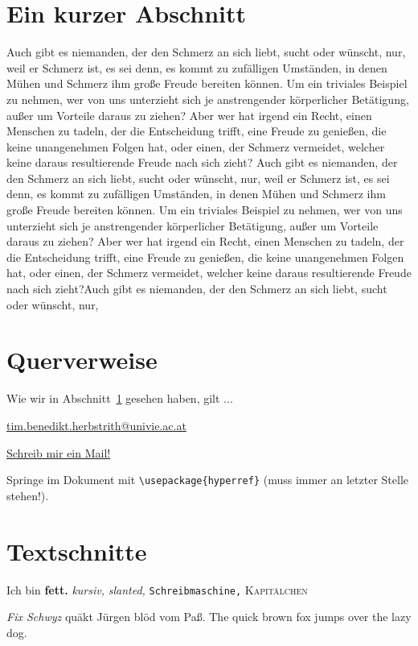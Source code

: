 \documentclass[a4paper]{article}
\begin{document}
\section{Ein kurzer Abschnitt} \label{sec:Ein kurzer Abschnitt}
Auch gibt es niemanden, der den Schmerz an sich liebt, sucht oder wünscht, nur, weil er Schmerz ist, es sei denn, es kommt zu zufälligen Umständen, in denen Mühen und Schmerz ihm große Freude bereiten können. Um ein triviales Beispiel zu nehmen, wer von uns unterzieht sich je anstrengender körperlicher Betätigung, außer um Vorteile daraus zu ziehen? Aber wer hat irgend ein Recht, einen Menschen zu tadeln, der die Entscheidung trifft, eine Freude zu genießen, die keine unangenehmen Folgen hat, oder einen, der Schmerz vermeidet, welcher keine daraus resultierende Freude nach sich zieht? Auch gibt es niemanden, der den Schmerz an sich liebt, sucht oder wünscht, nur, weil er Schmerz ist, es sei denn, es kommt zu zufälligen Umständen, in denen Mühen und Schmerz ihm große Freude bereiten können. Um ein triviales Beispiel zu nehmen, wer von uns unterzieht sich je anstrengender körperlicher Betätigung, außer um Vorteile daraus zu ziehen? Aber wer hat irgend ein Recht, einen Menschen zu tadeln, der die Entscheidung trifft, eine Freude zu genießen, die keine unangenehmen Folgen hat, oder einen, der Schmerz vermeidet, welcher keine daraus resultierende Freude nach sich zieht?Auch gibt es niemanden, der den Schmerz an sich liebt, sucht oder wünscht, nur, 


\section{Querverweise}
Wie wir in Abschnitt~\ref{sec:Ein kurzer Abschnitt} gesehen haben, gilt ...

\url{tim.benedikt.herbstrith@univie.ac.at}

\href{mailto:tim.benedikt.herbstrith@univie.ac.at}{Schreib mir ein Mail!}

Springe im Dokument mit \verb+\usepackage{hyperref}+ (muss immer an letzter Stelle stehen!).

\section{Textschnitte}
Ich bin \textbf{fett.} \textit{kursiv,} \textsl{slanted,} \texttt{Schreibmaschine,}
\textsc{Kapitälchen}

\emph{Fix Schwyz} quäkt Jürgen blöd vom Paß.
The quick brown fox jumps over the lazy dog.
\end{document}
